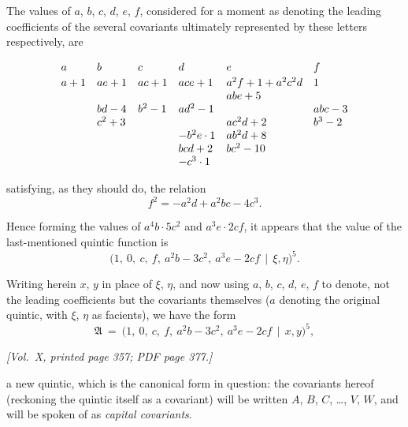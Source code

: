 \documentclass[11pt]{article}
\begin{document}
The values of $a$, $b$, $c$, $d$, $e$, $f$, considered for a moment as denoting the leading coefficients of the several covariants ultimately represented by these letters respectively, are

\medskip

\[
\begin{array}{l@{\quad}l@{\quad}l@{\quad}l@{\quad}l@{\quad}l}
a & b & c & d & e & f \\[2pt]
a+1 & ae+1 & ac+1 & ace+1 & a^{2}f+1+a^{2}c^{2}d & 1 \\
 & & & & abe+5 & \\
 & bd-4 & b^{2}-1 & ad^{2}-1 & & abc-3 \\
 & c^{2}+3 & & & ac^{2}d+2 & b^{3}-2 \\
 & & & -b^{2}e\cdot 1 & ab^{2}d+8 & \\
 & & & bcd+2 & bc^{2}-10 & \\
 & & & -c^{3}\cdot 1 & &
\end{array}
\]

satisfying, as they should do, the relation
\[
f^{2}=-a^{2}d+a^{2}bc-4c^{3}.
\]

Hence forming the values of $a^{4}b\cdot 5c^{2}$ and $a^{3}e\cdot 2cf$, it appears that the value of the last-mentioned quintic function is
\[
\bigl(1,\ 0,\ c,\ f,\ a^{2}b-3c^{2},\ a^{3}e-2cf\,\mid\,\xi,\eta\bigr)^{5}.
\]

Writing herein $x$, $y$ in place of $\xi$, $\eta$, and now using $a$, $b$, $c$, $d$, $e$, $f$ to denote, not the leading coefficients but the covariants themselves ($a$ denoting the original quintic, with $\xi$, $\eta$ as facients), we have the form
\[
\mathfrak{A}\ =\ \bigl(1,\ 0,\ c,\ f,\ a^{2}b-3c^{2},\ a^{3}e-2cf\,\mid\,x,y\bigr)^{5},
\]

\newpage

\noindent\textit{[Vol.~X, printed page 357; PDF page 377.]}

\medskip

a new quintic, which is the canonical form in question: the covariants hereof (reckoning the quintic itself as a covariant) will be written $A$, $B$, $C$, \ldots, $V$, $W$, and will be spoken of as \emph{capital covariants}.

\medskip
\end{document}
